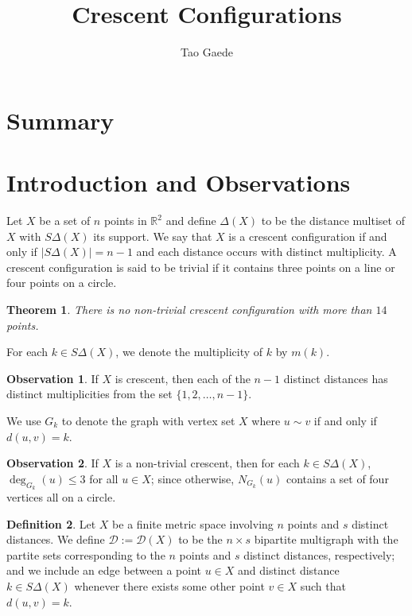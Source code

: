 \documentclass[12pt]{article}
\title{ \vspace{-3cm} Crescent Configurations}
\author{Tao Gaede}
\newcommand{\R}{\mathbb{R}}
\newtheorem{thm}{Theorem}[section] %
\theoremstyle{definition}
\newtheorem{defn}[thm]{Definition} %
\newtheorem{obs}{Observation}
\begin{document}
	\maketitle
	
	\section{Summary}
	

	\section{Introduction and Observations}
	Let $X$ be a set of $n$ points in $\R^2$ and define $\Delta(X)$ to be the distance multiset of $X$ with $S\Delta(X)$ its support.  We say that $X$ is a crescent configuration if and only if $|S\Delta(X)| = n-1$ and each distance occurs with distinct multiplicity.  A crescent configuration is said to be trivial if it contains three points on a line or four points on a circle.
	
	\begin{thm}\label{Thm-MainTheorem}
		There is no non-trivial crescent configuration with more than $14$ points.
	\end{thm}

	For each $k \in S\Delta(X)$, we denote the multiplicity of $k$ by $m(k)$.  
	
	\begin{obs}
		If $X$ is crescent, then each of the $n-1$ distinct distances has distinct multiplicities from the set $\{1, 2, \ldots, n-1\}$.
	\end{obs}
	
	We use $G_k$ to denote the graph with vertex set $X$ where $u \sim v$ if and only if $d(u,v) = k$.  
	
	\begin{obs}\label{Obs-Circles}
		If $X$ is a non-trivial crescent, then for each $k \in S\Delta(X)$, $\deg_{G_k}(u) \leq 3$ for all $u \in X$; since otherwise, $N_{G_k}(u)$ contains a set of four vertices all on a circle.
	\end{obs}
	
	\begin{defn}
		Let $X$ be a finite metric space involving $n$ points and $s$ distinct distances.  We define $\mathcal{D}:= \mathcal{D}(X)$ to be the $n \times s$ bipartite multigraph with the partite sets corresponding to the $n$ points and $s$ distinct distances, respectively; and we include an edge between a point $u \in X$ and distinct distance $k \in S \Delta(X)$ whenever there exists some other point $v \in X$ such that $d(u,v) = k$.
	\end{defn}
\end{document}
